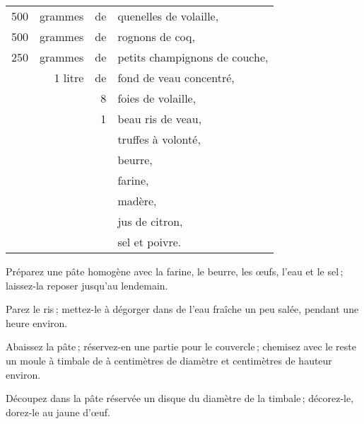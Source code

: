 \footnotesize
\begin{longtable}{rrrp{18em}}
    500 & grammes & de & quenelles de volaille,                                                           \\
    500 & grammes & de & rognons de coq,                                                                  \\
    250 & grammes & de & petits champignons de couche,                                                    \\
        & 1 litre & de & fond de veau concentré,                                                          \\
        &         &  8 & foies de volaille,                                                               \\
        &         &  1 & beau ris de veau,                                                                \\
        &         &    & truffes à volonté,                                                               \\
        &         &    & beurre,                                                                          \\
        &         &    & farine,                                                                          \\
        &         &    & madère,                                                                          \\
        &         &    & jus de citron,                                                                   \\
        &         &    & sel et poivre.                                                                   \\
\end{longtable}
\normalsize

Préparez une pâte homogène avec la farine, le beurre, les œufs, l'eau et le
sel ; laissez-la reposer jusqu'au lendemain.

Parez le ris ; mettez-le à dégorger dans de l'eau fraîche un peu salée, pendant
une heure environ.

Abaissez la pâte ; réservez-en une partie pour le couvercle ; chemisez avec le
reste un moule à timbale de {\mmm} à {\mmm} centimètres de diamètre et {\mmm} centimètres
de hauteur environ.

Découpez dans la pâte réservée un disque du diamètre de la timbale ;
décorez-le, dorez-le au jaune d'œuf.

